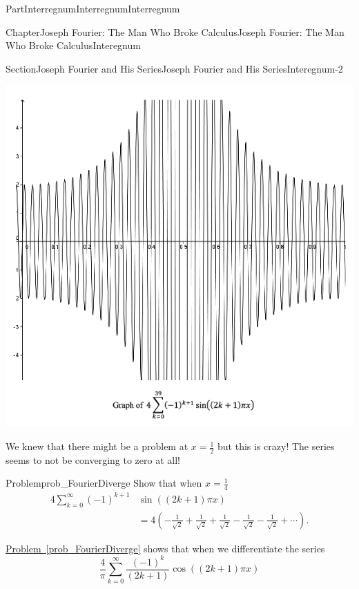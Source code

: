 \documentclass[oneside,10pt,]{book}
\newcommand{\xreffont}{\relax}
\numberwithin{equation}{part}
\newcommand{\amp}{&}
\begin{document}
\begin{partptx}{Part}{Interregnum}{}{Interregnum}{}{}{Interregnum}
\begin{chapterptx}{Chapter}{Joseph Fourier: The Man Who Broke Calculus}{}{Joseph Fourier: The Man Who Broke Calculus}{}{}{Interegnum}
\begin{sectionptx}{Section}{Joseph Fourier and His Series}{}{Joseph Fourier and His Series}{}{}{Interegnum-2}
\begin{image}{0.125}{0.75}{0.125}{}
\includegraphics[width=\linewidth]{external/images/FourierEx11.png}
\end{image}%
We knew that there might be a problem at \(x=\frac{1}{2}\) but this is crazy! The series seems to not be converging to zero at all!%
\begin{problem}{Problem}{}{prob_FourierDiverge}%
 Show that when \(x=\frac{1}{4}\)%
\begin{align*}
4\sum_{k=0}^\infty\left(-1\right)^{k+1}\amp{} \sin\left(\left(2k+1\right)\pi x\right)\\
\amp{}=4\left(-\frac{1}{\sqrt{2}}+\frac{1}{\sqrt{2}}+\frac{1}{\sqrt{2}}- \frac{1}{\sqrt{2}}-\frac{1}{\sqrt{2}}+\cdots\right).
\end{align*}
%
\end{problem}
\hyperref[prob_FourierDiverge]{Problem~{\xreffont\ref{prob_FourierDiverge}}} shows that when we differentiate the series%
\begin{equation*}
\frac{4}{\pi}\sum_{k=0}^\infty\frac{\left(-1\right)^k}{\left(2k+1\right)} \cos\left(\left(2k+1\right)\pi x\right)
\end{equation*}

\end{sectionptx}
\end{chapterptx}
\end{partptx}
\end{document}
